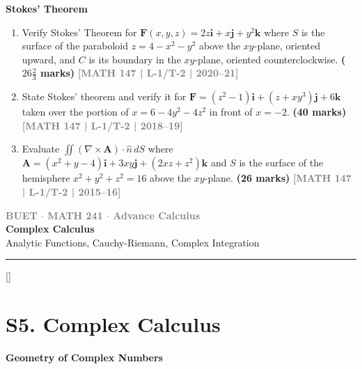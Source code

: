\documentclass[12pt,a3paper]{article}
\newcommand{\yr}[1]{\hfill\textcolor{gray}{\small\textbf{[#1]}}}
\newcommand{\mk}[1]{\textcolor{orange!70!black}{\small\textbf{(#1 marks)}}}
\newcommand{\subtopic}[2]{%
  \vspace{10pt}
  \noindent\begin{tcolorbox}[colback=#1!8,colframe=#1,boxrule=0.6pt,arc=4pt,
    left=6pt,right=6pt,top=4pt,bottom=4pt]
    \small\bfseries\textcolor{#1}{#2}
  \end{tcolorbox}
  \vspace{2pt}
}
\newcommand{\secdivider}[3]{%
  \newpage\thispagestyle{empty}%
  \vspace*{\fill}%
  \begin{tcolorbox}[enhanced,colback=#3!6,colframe=#3,boxrule=1.5pt,arc=8pt,
    left=20pt,right=20pt,top=22pt,bottom=22pt,
    shadow={3pt}{-3pt}{0pt}{black!15}]
    \centering
    {\large\textcolor{gray}{\textbf{BUET $\cdot$ MATH 241 $\cdot$ Advance Calculus}}}\\[8pt]
    {\fontsize{26}{32}\selectfont\bfseries\textcolor{#3}{#1}}\\[6pt]
    {\fontsize{15}{19}\selectfont\textcolor{dgray}{#2}}\\[12pt]
    \textcolor{#3!60}{\rule{0.5\textwidth}{0.5pt}}
  \end{tcolorbox}%
  \vspace*{\fill}\newpage%
}
\begin{document}
\subtopic{cD}{Stokes' Theorem}
\label{sub:s4-stokes}

\begin{enumerate}
    
\item Verify Stokes' Theorem for $\mathbf{F}(x,y,z)=2z\mathbf{i}+x\mathbf{j}+y^{2}\mathbf{k}$ where $S$ is the surface of the paraboloid $z=4-x^{2}-y^{2}$ above the $xy$-plane, oriented upward, and $C$ is its boundary in the $xy$-plane, oriented counterclockwise.
\mk{$26\tfrac{2}{3}$} \yr{MATH 147 | L-1/T-2 | 2020--21}


\item State Stokes' theorem and verify it for $\mathbf{F}=(z^{2}-1)\mathbf{i}+(z+xy^{3})\mathbf{j}+6\mathbf{k}$ taken over the portion of $x=6-4y^{2}-4z^{2}$ in front of $x=-2$.
\mk{40} \yr{MATH 147 | L-1/T-2 | 2018--19}


\item Evaluate $\displaystyle\iint(\nabla\times\mathbf{A})\cdot\hat{n}\,dS$ where $\mathbf{A}=(x^{2}+y-4)\mathbf{i}+3xy\mathbf{j}+(2xz+z^{2})\mathbf{k}$ and $S$ is the surface of the hemisphere $x^{2}+y^{2}+z^{2}=16$ above the $xy$-plane.
\mk{26} \yr{MATH 147 | L-1/T-2 | 2015--16}


\end{enumerate}


\secdivider{Complex Calculus}{Analytic Functions, Cauchy-Riemann, Complex Integration}{cE}

\titleformat{\section}{\large\bfseries\color{cE}}{}{0em}{}[\titlerule]

\section{S5. Complex Calculus}
\label{sec:S5}

\subtopic{cE}{Geometry of Complex Numbers}
\label{sub:s5-geometry}
\end{document}
